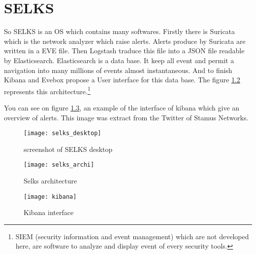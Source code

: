 
\chapter{SELKS}
\label{chap:selks}


So SELKS is an OS which contains many softwares. Firstly there is Suricata which is the network analyzer which
raise alerts. Alerts produce by Suricata are written in a EVE file. Then Logstash traduce this file into a JSON
file readable by Elasticsearch. Elasticsearch is a data base. It keep all event and permit a navigation into many
millions of events almost instantaneous. And to finish Kibana and Evebox propose a User interface for this data
base. The figure \ref{fig:selks_archi} represents this architecture.\footnote{SIEM (security information and event
  management) which are not developed here, are software to analyze and display event of every security
  tools.}%


You can see on figure \ref{fig:kibana}, an example of the interface of kibana which give an overview of alerts.
This image was extract from the Twitter of Stamus Networks.


\begin{figure}[h]
  \centering
  \texttt{[image: selks\_desktop]}
  \caption{screenshot of SELKS desktop}
  \label{fig:selks}
\end{figure}

\begin{figure}[h]
  \centering
  \texttt{[image: selks\_archi]}
  \caption{Selks architecture}
  \label{fig:selks_archi}
\end{figure}



\begin{figure}[h]
  \centering
  \texttt{[image: kibana]}
  \caption{Kibana interface}
  \label{fig:kibana}
\end{figure}


